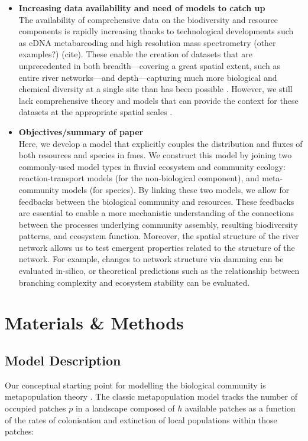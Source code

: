 \documentclass[11pt,a4paper]{article}
\newcommand{\fitem}[2]{\item {\bfseries #1} \\ #2}
\begin{document}
\begin{itemize}
	\fitem{Increasing data availability and need of models to catch up}
		{The availability of comprehensive data on the biodiversity and resource components is rapidly increasing thanks to technological developments such as eDNA metabarcoding and high resolution mass spectrometry (other examples?) (cite).
		These enable the creation of datasets that are unprecedented in both breadth---covering a great spatial extent, such as entire river networks---and depth---capturing much more biological and chemical diversity at a single site than has been possible \autocite{Altermatt2020}.
		However, we still lack comprehensive theory and models that can provide the context for these datasets at the appropriate spatial scales \autocite{Gounand2018}.}
	\fitem{Objectives/summary of paper}
		{Here, we develop a model that explicitly couples the distribution and fluxes of both resources and species in \acp{fme}.
		We construct this model by joining two commonly-used model types in fluvial ecosystem and community ecology: reaction-transport models (for the non-biological component), and meta-community models (for species).
		By linking these two models, we allow for feedbacks between the biological community and resources.
		These feedbacks are essential to enable a more mechanistic understanding of the connections between the processes underlying community assembly, resulting biodiversity patterns, and ecosystem function.
		Moreover, the spatial structure of the river network allows us to test emergent properties related to the structure of the network.
		For example, changes to network structure via damming can be evaluated in-silico, or theoretical predictions such as the relationship between branching complexity and ecosystem stability \autocite{Terui2018} can be evaluated.}
\end{itemize}


\section{Materials \& Methods}

\subsection{Model Description}

Our conceptual starting point for modelling the biological community is metapopulation theory \autocite{Levins1969}.
The classic metapopulation model tracks the number of occupied patches $p$ in a landscape composed of $h$ available patches as a function of the rates of colonisation and extinction of local populations within those patches:
\end{document}
